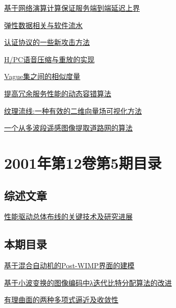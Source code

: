 \documentclass[a4paper]{article}
\begin{document}
\href{http://www.jos.org.cn/ch/reader/download_pdf.aspx?file_no=20010614&year_id=2001&quarter_id=6&falg=1}{基于网络演算计算保证服务端到端延迟上界}

\href{http://www.jos.org.cn/ch/reader/download_pdf.aspx?file_no=20010615&year_id=2001&quarter_id=6&falg=1}{弹性数据相关与软件流水}

\href{http://www.jos.org.cn/ch/reader/download_pdf.aspx?file_no=20010616&year_id=2001&quarter_id=6&falg=1}{认证协议的一些新攻击方法}

\href{http://www.jos.org.cn/ch/reader/download_pdf.aspx?file_no=20010617&year_id=2001&quarter_id=6&falg=1}{H/PC语音压缩与重放的实现}

\href{http://www.jos.org.cn/ch/reader/download_pdf.aspx?file_no=20010618&year_id=2001&quarter_id=6&falg=1}{Vague集之间的相似度量}

\href{http://www.jos.org.cn/ch/reader/download_pdf.aspx?file_no=20010619&year_id=2001&quarter_id=6&falg=1}{提高冗余服务性能的动态容错算法}

\href{http://www.jos.org.cn/ch/reader/download_pdf.aspx?file_no=20010620&year_id=2001&quarter_id=6&falg=1}{纹理流线:一种有效的二维向量场可视化方法}

\href{http://www.jos.org.cn/ch/reader/download_pdf.aspx?file_no=20010621&year_id=2001&quarter_id=6&falg=1}{一个从多波段遥感图像提取道路网的算法}


\section{\textbf{2001年第12卷第5期目录}}
\subsection{综述文章}
\href{http://www.jos.org.cn/ch/reader/download_pdf.aspx?file_no=20010507&year_id=2001&quarter_id=5&falg=1}{性能驱动总体布线的关键技术及研究进展}

\subsection{本期目录}
\href{http://www.jos.org.cn/ch/reader/download_pdf.aspx?file_no=20010501&year_id=2001&quarter_id=5&falg=1}{基于混合自动机的Post-WIMP界面的建模}

\href{http://www.jos.org.cn/ch/reader/download_pdf.aspx?file_no=20010502&year_id=2001&quarter_id=5&falg=1}{基于小波变换的图像编码中λ迭代比特分配算法的改进}

\href{http://www.jos.org.cn/ch/reader/download_pdf.aspx?file_no=20010503&year_id=2001&quarter_id=5&falg=1}{有理曲面的两种多项式逼近及收敛性}
\end{document}
